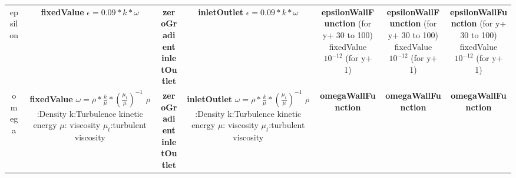 \documentclass{article}
\begin{document}
\begin{landscape}
\begin{table}[h!]
\begin{tabular}{ccccccc}
epsilon &\makecell{\textbf{fixedValue} \\ $\epsilon=0.09*k*\omega$} &	\makecell{\textbf{zeroGradient} \\ \textbf{inletOutlet}} &\makecell{ \textbf{inletOutlet} \\  $\epsilon=0.09*k*\omega$}	 & \makecell{\textbf{epsilonWallFunction} \\ (for y+ 30 to 100) \\ fixedValue $10^{-12}$ \\ (for y+ 1) }&	\makecell{\textbf{epsilonWallFunction} \\ (for y+ 30 to 100) \\ fixedValue $10^{-12}$ \\ (for y+ 1) } & \makecell{\textbf{epsilonWallFunction} \\ (for y+ 30 to 100) \\ fixedValue $10^{-12}$ \\ (for y+ 1) } \\

omega & 	\makecell{\textbf{fixedValue} \\ $\omega = \rho*\frac{k}{\mu}*(\frac{\mu_t}{\mu})^{-1}$\\ $\rho$:Density \\ k:Turbulence \\ kinetic energy \\ $\mu$: viscosity \\ $\mu_t$:turbulent viscosity} &	\makecell{\textbf{zeroGradient} \\ \textbf{inletOutlet}}	 & \makecell{\textbf{inletOutlet} \\ $\omega = \rho*\frac{k}{\mu}*(\frac{\mu_t}{\mu})^{-1}$\\ $\rho$:Density \\ k:Turbulence kinetic energy \\ $\mu$: viscosity \\ $\mu_t$:turbulent viscosity}	 &  \textbf{omegaWallFunction} &	\textbf{omegaWallFunction}  & \textbf{omegaWallFunction}\\


\end{tabular}
\end{table}
\end{landscape}
\end{document}

